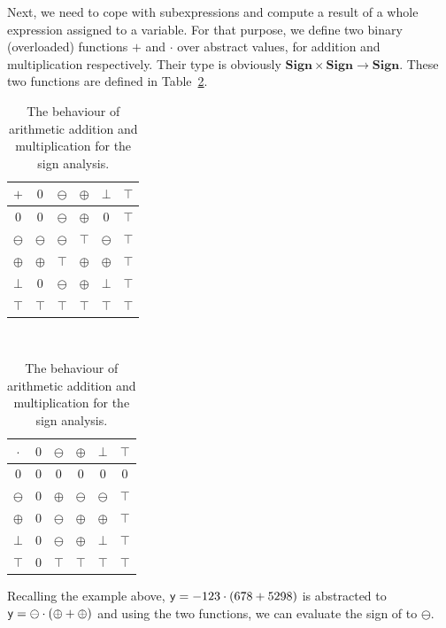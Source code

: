 Next, we need to cope with subexpressions and compute a result of a whole
expression assigned to a variable. For that purpose, we define two binary
(overloaded) functions $+$ and $\cdot$ over abstract values, for addition and
multiplication respectively. Their type is obviously $\mathbf{Sign} \times
\mathbf{Sign} \rightarrow \mathbf{Sign}$.  These two functions are defined in
Table~\ref{tab:state_ai_addmult}.
\begin{table}[tb]
  \begin{center}
    \begin{tabular}{|c||c|c|c|c|c|}\hline
      $+$       & $0$       & $\ominus$ & $\oplus$ & $\bot$    & $\top$ \\ \hline \hline
      $0$       & $0$       & $\ominus$ & $\oplus$ & $0$       & $\top$ \\ \hline
      $\ominus$ & $\ominus$ & $\ominus$ & $\top$   & $\ominus$ & $\top$ \\ \hline
      $\oplus$  & $\oplus$  & $\top$    & $\oplus$ & $\oplus$  & $\top$ \\ \hline
      $\bot$    & $0$       & $\ominus$ & $\oplus$ & $\bot$    & $\top$ \\ \hline
      $\top$    & $\top$    & $\top$    & $\top$   & $\top$    & $\top$ \\ \hline
    \end{tabular} ~~
    \begin{tabular}{|c||c|c|c|c|c|}\hline
      $\cdot$   & $0$ & $\ominus$ & $\oplus$  & $\bot$    & $\top$ \\ \hline \hline
      $0$       & $0$ & $0$       & $0$       & $0$       & $0$    \\ \hline
      $\ominus$ & $0$ & $\oplus$  & $\ominus$ & $\ominus$ & $\top$ \\ \hline
      $\oplus$  & $0$ & $\ominus$ & $\oplus$  & $\oplus$  & $\top$ \\ \hline
      $\bot$    & $0$ & $\ominus$ & $\oplus$  & $\bot$    & $\top$ \\ \hline
      $\top$    & $0$ & $\top$    & $\top$    & $\top$    & $\top$ \\ \hline
    \end{tabular}
  \end{center}
  \caption{The behaviour of arithmetic addition and multiplication for the
  sign analysis.}
  \label{tab:state_ai_addmult}
\end{table}
Recalling the example above, $\mathsf{y} = -123 \cdot (678 + 5298)$ is abstracted
to $\mathsf{y} = \ominus \cdot (\oplus + \oplus)$ and using the two functions, we
can evaluate the sign of  to $\ominus$.

